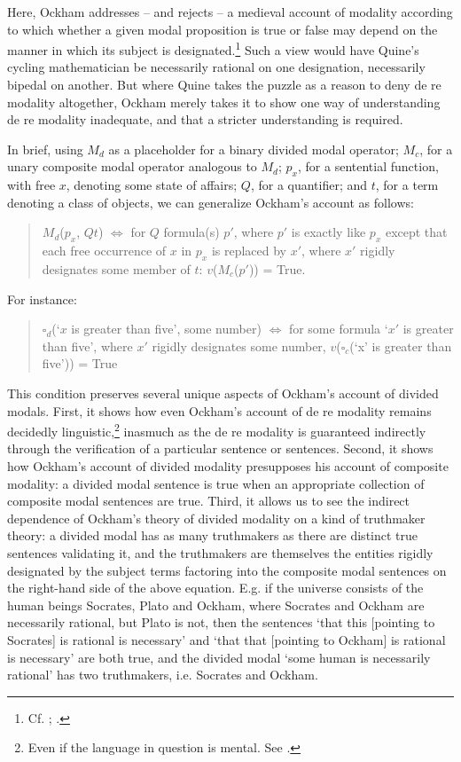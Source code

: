 \documentclass[]{article}
\begin{document}
\noindent Here, Ockham addresses – and rejects – a medieval account of modality according to which whether a given modal proposition is true or false may depend on the manner in which its subject is designated.\footnote{Cf. \cite[ch. 3, 12]{Anselm1974}; \cite[ch. 12]{AquinasDF}.} Such a view would have Quine's cycling mathematician be necessarily rational on one designation, necessarily bipedal on another. But where Quine takes the puzzle as a reason to deny de re modality altogether, Ockham merely takes it to show one way of understanding de re modality inadequate, and that a stricter understanding is required.

In brief, using $M_{d}$ as a placeholder for a binary divided modal operator; $M_{c}$, for a unary composite modal operator analogous to $M_{d}$; $p_{x}$, for a sentential function, with free $x$, denoting some state of affairs; $Q$, for a quantifier; and $t$, for a term denoting a class of objects, we can generalize Ockham's account as follows:
\begin{quote}
	$M_{d}$($p_{x}$, $Qt$) $\Leftrightarrow$ for $Q$ formula(s) $p'$, where  $p'$ is exactly like $p_{x}$ except that each free occurrence of $x$ in $p_{x}$ is replaced by $x'$, where $x'$ rigidly designates some member of $t$: $v$($M_{c}$($p'$)) = True.
\end{quote}

For instance:
\begin{quote}
	$\square_{d}$(`$x$ is greater than five', some number) $\Leftrightarrow$ for some formula `$x'$ is greater than five', where $x'$ rigidly designates some number, $v$($\square_{c}$(`x' is greater than five')) = True
\end{quote}

This condition preserves several unique aspects of Ockham's account of divided modals. First, it shows how even Ockham's account of de re modality remains decidedly linguistic,\footnote{Even if the language in question is mental. See \cite{Panaccio1999}.}  inasmuch as the de re modality is guaranteed indirectly through the verification of a particular sentence or sentences. Second, it shows how Ockham's account of divided modality presupposes his account of composite modality: a divided modal sentence is true when an appropriate collection of composite modal sentences are true. Third, it allows us to see the indirect dependence of Ockham's theory of divided modality on a kind of truthmaker theory: a divided modal has as many truthmakers as there are distinct true sentences validating it, and the truthmakers are themselves the entities rigidly designated by the subject terms factoring into the composite modal sentences on the right-hand side of the above equation. E.g. if the universe consists of the human beings Socrates, Plato and Ockham, where Socrates and Ockham are necessarily rational, but Plato is not, then the sentences `that this [pointing to Socrates] is rational is necessary' and `that that [pointing to Ockham] is rational is necessary' are both true, and the divided modal `some human is necessarily rational' has two truthmakers, i.e. Socrates and Ockham.
\end{document}
